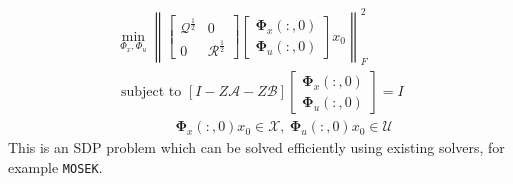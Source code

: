 \documentclass{article}[12pt]
\begin{document}
\begin{equation}
    \begin{array}{c}{\min _{\Phi_{x}, \Phi_{u}}\left\|\left[\begin{array}{cc}{\mathcal{Q}^{\frac{1}{2}}} & {0} \\ {0} & {\mathcal{R}^{\frac{1}{2}}}\end{array}\right]\left[\begin{array}{l}{\mathbf{\Phi}_{x}(:, 0)} \\ {\mathbf{\Phi}_{u}(:, 0)}\end{array}\right] x_{0}\right\|_{F}^{2}} \\ {\text { subject to }[I-Z \mathcal{A}-Z \mathcal{B}]\left[\begin{array}{l}{\mathbf{\Phi}_{x}(:, 0)} \\ {\mathbf{\Phi}_{u}(:, 0)}\end{array}\right]=I} \\ \qquad \qquad \  {\mathbf{\Phi}_{x}(:, 0) x_{0} \in \mathcal{X}, \ \mathbf{\Phi}_{u}(:, 0) x_{0} \in \mathcal{U}}\end{array}
\end{equation}
This is an SDP problem which can be solved efficiently using existing solvers, for example \texttt{MOSEK}.
\end{document}

